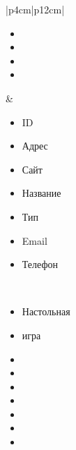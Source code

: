 \begin{table}[h!]
\begin{center}
\begin{threeparttable}
\begin{tabular}{|p{4cm}|p{12cm}|}
\begin{minipage}[t]{\linewidth}
\begin{multicols}{1}
\begin{itemize}[leftmargin=0mm,labelsep=0mm,nosep,after=\strut]
                  \item[]
                  \item[]
                  \item[]
                  \item[]
                \end{itemize}
              \end{multicols}
            \end{minipage}
          & \begin{minipage}[t]{\linewidth}
              \begin{multicols}{2}
                \begin{itemize}[leftmargin=0mm,labelsep=0mm,nosep,after=\strut]
                  \item[] ID
                  \item[] Адрес
                  \item[] Сайт
                  \item[] Название
                  \item[] Тип
                  \item[] Email
                  \item[] Телефон
                \end{itemize}
              \end{multicols}
            \end{minipage}\\
            \hline
            \begin{minipage}[t]{\linewidth}
              \begin{multicols}{1}
                \begin{itemize}[leftmargin=0mm,labelsep=0mm,nosep,after=\strut]
                  \item[] Настольная
                  \item[] игра
                  \item[]
                  \item[]
                  \item[]
                  \item[]
                  \item[]
                  \item[]
                  \item[]
                \end{itemize}
              \end{multicols}
            \end{minipage}

\end{tabular}
\end{threeparttable}
\end{center}
\end{table}
